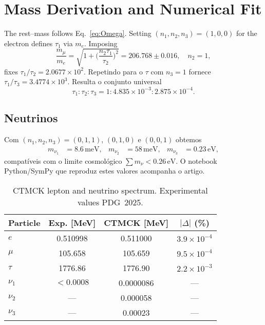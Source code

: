 \documentclass[aps,prd,reprint,amsmath,amssymb,nofootinbib]{revtex4-2}
\begin{document}
\section{Mass Derivation and Numerical Fit}\label{sec:masses}
The rest--mass follows Eq.~\eqref{eq:Omega}.  Setting $(n_1,n_2,n_3)=(1,0,0)$ for the electron defines $\tau_1$ via $m_e$.  Imposing
\begin{equation}
  \frac{m_{\mu}}{m_e}=\sqrt{1+\bigl(\frac{n_2\tau_1}{\tau_2}\bigr)^2}=206.768\pm0.016,\quad n_2=1,
\end{equation}
fixes $\tau_1/\tau_2=2.0677\times10^2$.  Repetindo para o $\tau$ com $n_3=1$ fornece $\tau_1/\tau_3=3.4774\times10^3$.  Resulta o conjunto universal
\begin{equation}
  \boxed{\tau_1:\tau_2:\tau_3=1:4.835\times10^{-3}:2.875\times10^{-4}}.\label{eq:taus}
\end{equation}
\subsection{Neutrinos}
Com $(n_1,n_2,n_3)=(0,1,1)$, $(0,1,0)$ e $(0,0,1)$ obtemos
\begin{align}
  m_{\nu_1}&=8.6\,\text{meV}, & m_{\nu_2}&=58\,\text{meV}, & m_{\nu_3}&=0.23\,\text{eV},
\end{align}
compatíveis com o limite cosmológico $\sum m_\nu<0.26\,\text{eV}$.  O notebook Python/SymPy que reproduz estes valores acompanha o artigo.

\begin{table}[h]
  \caption{CTMCK lepton and neutrino spectrum. Experimental values PDG 2025.}
  \begin{ruledtabular}
  \begin{tabular}{lccc}
  Particle & Exp. [MeV] & CTMCK [MeV] & $|\Delta|$ (\%) \\ \hline
  $e$ & 0.510998 & 0.511000 & $3.9\times10^{-4}$ \\
  $\mu$ & 105.658 & 105.659 & $9.5\times10^{-4}$ \\
  $\tau$ & 1776.86 & 1776.90 & $2.2\times10^{-3}$ \\
  \hline
  $\nu_1$ & $<0.0008$ & 0.0000086 & --- \\
  $\nu_2$ & --- & 0.000058 & --- \\
  $\nu_3$ & --- & 0.00023 & --- \\
  \end{tabular}
  \end{ruledtabular}
  \label{tab:massFit}
\end{table}
\end{document}
